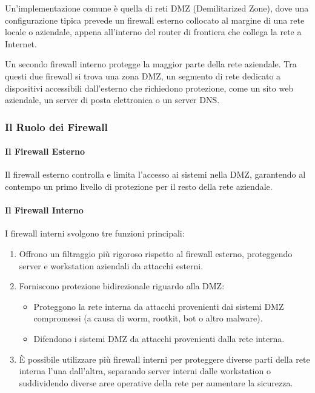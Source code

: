 Un'implementazione comune è quella di reti DMZ (Demilitarized Zone), dove una configurazione tipica prevede un firewall esterno collocato al margine di una rete locale o aziendale, appena all'interno del router di frontiera che collega la rete a Internet.

Un secondo firewall interno protegge la maggior parte della rete aziendale. Tra questi due firewall si trova una zona DMZ, un segmento di rete dedicato a dispositivi accessibili dall'esterno che richiedono protezione, come un sito web aziendale, un server di posta elettronica o un server DNS.

\subsubsection{Il Ruolo dei Firewall}

\paragraph{Il Firewall Esterno}

Il firewall esterno controlla e limita l'accesso ai sistemi nella DMZ, garantendo al contempo un primo livello di protezione per il resto della rete aziendale.

\paragraph{Il Firewall Interno}

I firewall interni svolgono tre funzioni principali:

\begin{enumerate}
    \item Offrono un filtraggio più rigoroso rispetto al firewall esterno, proteggendo server e workstation aziendali da attacchi esterni.
    
    \item Forniscono protezione bidirezionale riguardo alla DMZ:
    \begin{itemize}
        \item Proteggono la rete interna da attacchi provenienti dai sistemi DMZ compromessi (a causa di worm, rootkit, bot o altro malware).
        \item Difendono i sistemi DMZ da attacchi provenienti dalla rete interna.
    \end{itemize}
    
    \item È possibile utilizzare più firewall interni per proteggere diverse parti della rete interna l'una dall'altra, separando server interni dalle workstation o suddividendo diverse aree operative della rete per aumentare la sicurezza.
\end{enumerate}

